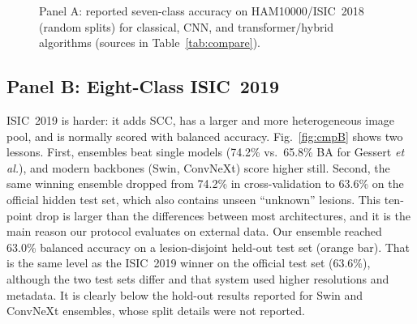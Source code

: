 \begin{figure}[t]
\centering
{}
\caption{Panel A: reported seven-class accuracy on HAM10000/ISIC~2018
(random splits) for classical, CNN, and transformer/hybrid algorithms
(sources in Table~\ref{tab:compare}).}
\label{fig:cmpA}
\end{figure}

\subsection{Panel B: Eight-Class ISIC~2019}
ISIC~2019 is harder: it adds SCC, has a larger and more heterogeneous
image pool, and is normally scored with balanced accuracy.
Fig.~\ref{fig:cmpB} shows two lessons. First, ensembles beat single
models (74.2\% vs.\ 65.8\% BA for Gessert \emph{et al.}), and modern
backbones (Swin, ConvNeXt) score higher still. Second, the same winning
ensemble dropped from 74.2\% in cross-validation to 63.6\% on the
official hidden test set, which also contains unseen ``unknown''
lesions. This ten-point drop is larger than the differences between most
architectures, and it is the main reason our protocol evaluates on
external data. Our ensemble reached 63.0\% balanced accuracy on a
lesion-disjoint held-out test set (orange bar). That is the same level as
the ISIC~2019 winner on the official test set (63.6\%), although the two
test sets differ and that system used higher resolutions and metadata.
It is clearly below the hold-out results reported for Swin and ConvNeXt
ensembles, whose split details were not reported.


